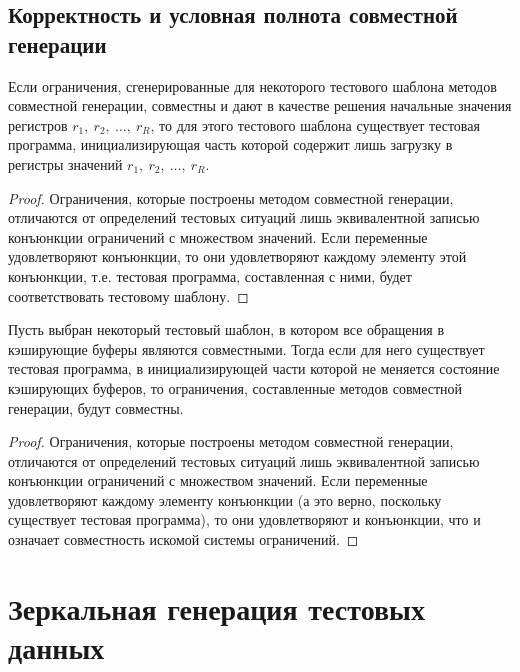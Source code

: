 \subsection{Корректность и условная полнота совместной генерации}

\begin{theorem} Если ограничения, сгенерированные для некоторого
тестового шаблона методов совместной генерации, совместны и дают в
качестве решения начальные значения регистров
$r_1,~r_2,~\dots,~r_R$, то для этого тестового шаблона существует
тестовая программа, инициализирующая часть которой содержит лишь
загрузку в регистры значений $r_1,~r_2,~\dots,~r_R$.
\end{theorem}
\begin{proof}
  Ограничения, которые построены методом совместной генерации,
  отличаются от определений тестовых ситуаций лишь эквивалентной
  записью конъюнкции ограничений с множеством значений. Если
  переменные удовлетворяют конъюнкции, то они удовлетворяют каждому
  элементу этой конъюнкции, т.е. тестовая программа, составленная с
  ними, будет соответствовать тестовому шаблону.
\end{proof}

\begin{theorem}
Пусть выбран некоторый тестовый шаблон, в котором все обращения в
кэширующие буферы являются совместными. Тогда если для него
существует тестовая программа, в инициализирующей части которой не
меняется состояние кэширующих буферов, то ограничения, составленные
методов совместной генерации, будут совместны.
\end{theorem}
\begin{proof}
  Ограничения, которые построены методом совместной генерации,
  отличаются от определений тестовых ситуаций лишь эквивалентной
  записью конъюнкции ограничений с множеством значений. Если
  переменные удовлетворяют каждому элементу конъюнкции (а это верно,
  поскольку существует тестовая программа), то они удовлетворяют и
  конъюнкции, что и означает совместность искомой системы ограничений.
\end{proof}


\section{Зеркальная генерация тестовых данных}

